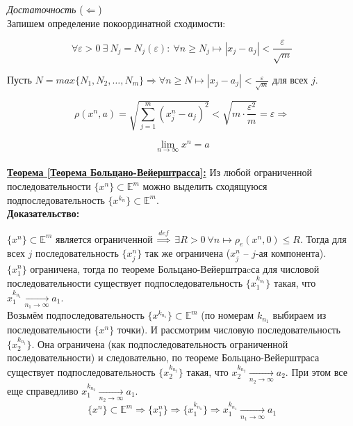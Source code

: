 \documentclass[a4paper,12pt]{article} %
\begin{document}
\textit{Достаточность} ($\Leftarrow$)\\

Запишем определение покоординатной сходимости:

\[ \forall \varepsilon > 0 ~ \exists ~ N_j = N_j(\varepsilon) : ~ \forall n \geqslant N_j \mapsto |x_j - a_j| < \frac{\varepsilon}{\sqrt{m}} \]

Пусть $N = max\{N_1, N_2, \dots, N_m \} \Rightarrow \forall n \geqslant N \mapsto |x_j - a_j| < \frac{\varepsilon}{\sqrt{m}}$ для всех $j$.

\[ \rho(x^n, a) = \sqrt{\sum\limits_{j = 1}^m (x_j^n - a_j)^2} < \sqrt{m \cdot \frac{\varepsilon^2}{m}} = \varepsilon \Rightarrow \]

\[ \lim\limits_{n \to \infty} x^n = a \]\\

\underline{\textbf{Теорема [Теорема Больцано-Вейерштрасса]:}} Из любой ограниченной последовательности $\{x^n \} \subset \mathbb{E}^m$ можно выделить сходящуюся подпоследовательность $\{x^{k_n} \} \subset \mathbb{E}^m$.\\

\textbf{Доказательство:}

$\{x^n \} \subset \mathbb{E}^m$ является ограниченной $\stackrel{def}{\Rightarrow}$ $\exists R > 0 ~ \forall n \mapsto \rho_e(x^n, 0) \leqslant R$. Тогда для всех $j$ последовательность $\{x_j^n \}$ так же ограничена ($x_j^n$ -- $j$-ая компонента).\\

$\{x_1^n \}$ ограничена, тогда по теореме Больцано-Вейерштраcса для числовой последовательности существует подпоследовательность $\{x_1^{k_{n_1}} \}$ такая, что $x_1^{k_{n_1}} \xrightarrow[n_1 \to \infty]{} a_1$.\\

Возьмём подпоследовательность $\{x^{k_{n_1}} \} \subset \mathbb{E}^m$ (по номерам $k_{n_1}$ выбираем из последовательности $\{x^n \}$ точки). И рассмотрим числовую последовательность $\{x_2^{k_{n_1}} \}$. Она ограничена (как подпоследовательность ограниченной последовательности) и следовательно, по теореме Больцано-Вейерштраса существует подпоследовательность $\{x_2^{k_{n_2}} \}$ такая, что $x_2^{k_{n_2}} \xrightarrow[n_2 \to \infty]{} a_2$. При этом все еще справедливо $x_1^{k_{n_2}} \xrightarrow[n_2 \to \infty]{} a_1$.\\

\begin{equation*}
    \{x^n \} \subset \mathbb{E}^m \Rightarrow \{x_1^n \} \Rightarrow \{x_1^{k_{n_1}} \} \Rightarrow x_1^{k_{n_1}} \xrightarrow[n_1 \to \infty]{} a_1
\end{equation*}
\end{document}
